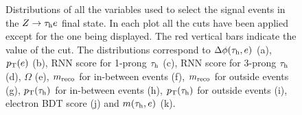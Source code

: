 \begin{figure}[H]
	\caption{Distributions of all the variables used to select the signal events in the $Z\to\tau_\text{h} e$ final state. In each plot all the cuts have been applied except for the one being displayed. The red vertical bars indicate the value of the cut. The distributions correspond to $\Delta\phi(\tau_\text{h},e)$ (a), $p_\text{T}(e)$ (b), RNN score for 1-prong $\tau_\text{h}$ (c), RNN score for 3-prong $\tau_\text{h}$ (d), $\Omega$ (e), $m_{\text{reco}}$ for in-between events (f), $m_{\text{reco}}$ for outside events (g), $p_\text{T}(\tau_\text{h})$ for in-between events (h), $p_\text{T}(\tau_\text{h})$ for outside events (i), electron BDT score (j) and $m(\tau_\text{h},e)$ (k).}
	\label{Fig18}
\end{figure}
